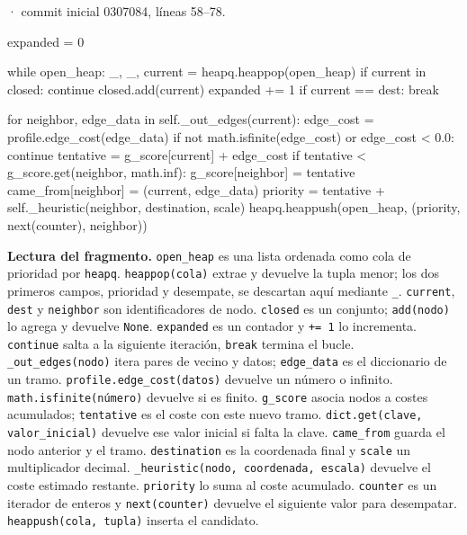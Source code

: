 \documentclass[11pt,a4paper]{article}
\begin{document}
\smallskip
{\footnotesize\texttt{} · commit inicial 0307084, líneas 58--78.}\par
\begin{Codigo}[firstnumber=58]
        expanded = 0

        while open_heap:
            _, _, current = heapq.heappop(open_heap)
            if current in closed:
                continue
            closed.add(current)
            expanded += 1
            if current == dest:
                break

            for neighbor, edge_data in self._out_edges(current):
                edge_cost = profile.edge_cost(edge_data)
                if not math.isfinite(edge_cost) or edge_cost < 0.0:
                    continue
                tentative = g_score[current] + edge_cost
                if tentative < g_score.get(neighbor, math.inf):
                    g_score[neighbor] = tentative
                    came_from[neighbor] = (current, edge_data)
                    priority = tentative + self._heuristic(neighbor, destination, scale)
                    heapq.heappush(open_heap, (priority, next(counter), neighbor))
\end{Codigo}

\textbf{Lectura del fragmento.} \texttt{open\_heap} es una lista ordenada como cola de prioridad por \texttt{heapq}. \texttt{heappop(cola)} extrae y devuelve la tupla menor; los dos primeros campos, prioridad y desempate, se descartan aquí mediante \texttt{\_}. \texttt{current}, \texttt{dest} y \texttt{neighbor} son identificadores de nodo. \texttt{closed} es un conjunto; \texttt{add(nodo)} lo agrega y devuelve \texttt{None}. \texttt{expanded} es un contador y \texttt{+= 1} lo incrementa. \texttt{continue} salta a la siguiente iteración, \texttt{break} termina el bucle. \texttt{\_out\_edges(nodo)} itera pares de vecino y datos; \texttt{edge\_data} es el diccionario de un tramo. \texttt{profile.edge\_cost(datos)} devuelve un número o infinito. \texttt{math.isfinite(número)} devuelve si es finito. \texttt{g\_score} asocia nodos a costes acumulados; \texttt{tentative} es el coste con este nuevo tramo. \texttt{dict.get(clave, valor\_inicial)} devuelve ese valor inicial si falta la clave. \texttt{came\_from} guarda el nodo anterior y el tramo. \texttt{destination} es la coordenada final y \texttt{scale} un multiplicador decimal. \texttt{\_heuristic(nodo, coordenada, escala)} devuelve el coste estimado restante. \texttt{priority} lo suma al coste acumulado. \texttt{counter} es un iterador de enteros y \texttt{next(counter)} devuelve el siguiente valor para desempatar. \texttt{heappush(cola, tupla)} inserta el candidato.
\end{document}
